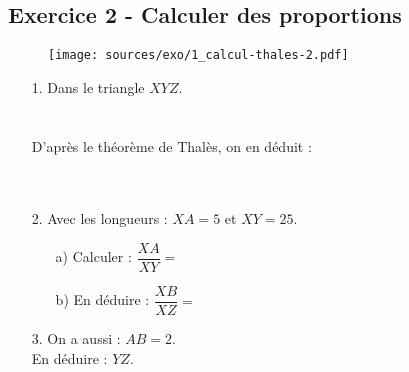 \documentclass[12pt]{article}
\begin{document}
\begin{multicols}{2}
\subsection*{Exercice 2 - Calculer des proportions}

  \begin{figure}[H]
    \centering
    \texttt{[image: sources/exo/1\_calcul-thales-2.pdf]}
  \end{figure}


  \begin{enumerate}
  \item[1.] Dans le triangle $XYZ$.\\ 
    \phantom{abc}\\
    \phantom{abc}\\
    D'après le théorème de Thalès, on en déduit :\\
    \phantom{abc}\\
    \phantom{abc}\\
    
  \item[2.] Avec les longueurs : $XA = 5$ et $XY = 25$.
    \begin{enumerate}
    \item[a)] Calculer : $\dfrac{XA}{XY} = $\\
    \item[b)] En déduire : $\dfrac{XB}{XZ} = $\\
    \end{enumerate}

  \item[3.] On a aussi : $AB = 2$.\\
    En déduire : $YZ$.\\
  \end{enumerate}
\end{multicols}
\end{document}
